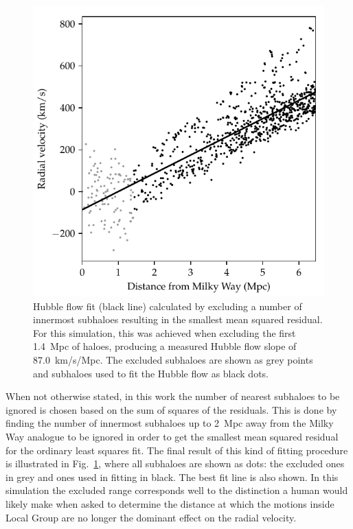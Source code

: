 \documentclass[english, oneside]{HYgradu}
\begin{document}
\begin{figure}
    \centering
    \includegraphics{kuvat/hubblefit.pdf}
    \caption{Hubble flow fit (black line) calculated by excluding a number of innermost subhaloes resulting in the smallest mean squared residual. For this simulation, this was achieved when excluding the first 1.4~Mpc of haloes, producing a measured Hubble flow slope of 87.0~km/s/Mpc. The excluded subhaloes are shown as grey points and subhaloes used to fit the Hubble flow as black dots.}\label{fig:hubblefit} %
\end{figure}

When not otherwise stated, in this work the number of nearest subhaloes to be ignored is chosen based on the sum of squares of the residuals. This is done by finding the number of innermost subhaloes up to 2~Mpc away from the Milky Way analogue to be ignored in order to get the smallest mean squared residual for the ordinary least squares fit. The final result of this kind of fitting procedure is illustrated in Fig.~\ref{fig:hubblefit}, where all subhaloes are shown as dots: the excluded ones in grey and ones used in fitting in black. The best fit line is also shown. In this simulation the excluded range corresponds well to the distinction a human would likely make when asked to determine the distance at which the motions inside Local Group are no longer the dominant effect on the radial velocity.
\end{document}
